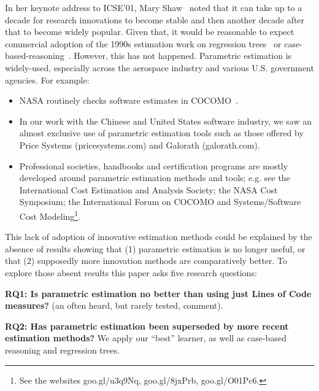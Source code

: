 \documentclass{sig-alternate}
\newcommand{\bi}{\begin{itemize}[leftmargin=0.4cm]}
\newcommand{\ei}{\end{itemize}}
\begin{document}


In her keynote address to ICSE'01, Mary Shaw~\cite{shaw01} noted that it can take up to a
decade  for  research innovations
to become stable and then another decade after that to become widely popular. Given that, it would be reasonable
to expect commercial adoption of  the 1990s estimation work
on  regression trees~\cite{shepperd97} or case-based-reasoning~\cite{shepperd97}. However, 
this has not happened.
Parametric estimation is
widely-used, especially across the aerospace
industry and various U.S. government agencies. For example:
\bi 
\item 
NASA routinely checks  software estimates 
in  COCOMO~\cite{dabney07}.  
\item
In our work with the Chinese and United States software industry,
we saw an   almost exclusive
use  of parametric estimation tools such as those offered by 
Price Systems (pricesystems.com) and  Galorath (galorath.com).
\item 
Professional societies, handbooks and
certification programs are mostly developed around 
parametric estimation methods and tools; e.g. see the 
International Cost Estimation and Analysis Society; the
NASA Cost Symposium;  the
International Forum on COCOMO and Systems/Software
Cost Modeling\footnote{See the websites goo.gl/u3q9Nq, goo.gl/8jxPrb, goo.gl/O01Pc6.}.
\ei
This  lack of adoption of   innovative  estimation methods
could be explained by the absence of results showing that
(1) parametric estimation is no longer useful, or that
(2) supposedly more innovation methods 
are comparatively better. 
To explore those absent results this paper asks five research questions:


{\bf RQ1: Is parametric estimation no better than
   using just Lines of Code measures?} 
  (an   often heard, but rarely tested, comment).

{\bf RQ2: Has parametric estimation been superseded
 by more recent estimation methods?}  We  
 apply our ``best''
learner, as well as 
case-based reasoning and regression trees.
\end{document}
